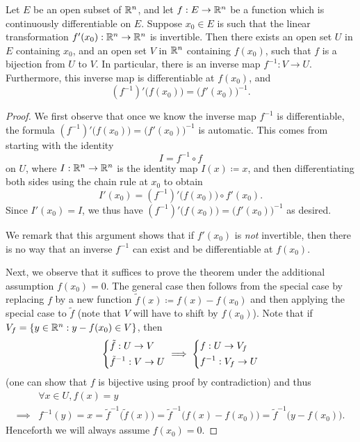 \begin{thm}\label{6.7.2}
  Let \(E\) be an open subset of \(\mathbb{R}^n\), and let \(f : E \to \mathbb{R}^n\) be a function which is continuously differentiable on \(E\).
  Suppose \(x_0 \in E\) is such that the linear transformation \(f'(x_0) : \mathbb{R}^n \to \mathbb{R}^n\) is invertible.
  Then there exists an open set \(U\) in \(E\) containing \(x_0\), and an open set \(V\) in \(\mathbb{R}^n\) containing \(f(x_0)\), such that \(f\) is a bijection from \(U\) to \(V\).
  In particular, there is an inverse map \(f^{-1} : V \to U\).
  Furthermore, this inverse map is differentiable at \(f(x_0)\), and
  \[
    (f^{-1})' \big(f(x_0)\big) = \big(f'(x_0)\big)^{-1}.
  \]
\end{thm}

\begin{proof}
  We first observe that once we know the inverse map \(f^{-1}\) is differentiable, the formula \((f^{-1})' \big(f(x_0)\big) = \big(f'(x_0)\big)^{-1}\) is automatic.
  This comes from starting with the identity
  \[
    I = f^{-1} \circ f
  \]
  on \(U\), where \(I : \mathbb{R}^n \to \mathbb{R}^n\) is the identity map \(I(x) \coloneqq x\), and then differentiating both sides using the chain rule at \(x_0\) to obtain
  \[
    I'(x_0) = (f^{-1})' \big(f(x_0)\big) \circ f'(x_0).
  \]
  Since \(I'(x_0) = I\), we thus have \((f^{-1})' \big(f(x_0)\big) = \big(f'(x_0)\big)^{-1}\) as desired.

  We remark that this argument shows that if \(f'(x_0)\) is \emph{not} invertible, then there is no way that an inverse \(f^{-1}\) can exist and be differentiable at \(f(x_0)\).

  Next, we observe that it suffices to prove the theorem under the additional assumption \(f(x_0) = 0\).
  The general case then follows from the special case by replacing \(f\) by a new function \(\tilde{f}(x) \coloneqq f(x) - f(x_0)\) and then applying the special case to \(\tilde{f}\)
  (note that \(V\) will have to shift by \(f(x_0)\)).
  Note that if \(V_f = \left\lbrace y \in \mathbb{R}^n : y - f(x_0) \in V\right\rbrace\), then
  \[
    \begin{dcases}
      \tilde{f} : U \to V \\
      \tilde{f}^{-1} : V \to U
    \end{dcases} \implies \begin{dcases}
      f : U \to V_f \\
      f^{-1} : V_f \to U
    \end{dcases}
  \]
  (one can show that \(f\) is bijective using proof by contradiction)
  and thus
  \begin{align*}
             & \forall x \in U, f(x) = y                                                                                                          \\
    \implies & f^{-1}(y) = x = \tilde{f}^{-1}\big(\tilde{f}(x)\big) = \tilde{f}^{-1}\big(f(x) - f(x_0)\big) = \tilde{f}^{-1}\big(y - f(x_0)\big).
  \end{align*}
  Henceforth we will always assume \(f(x_0) = 0\).


\end{proof}
